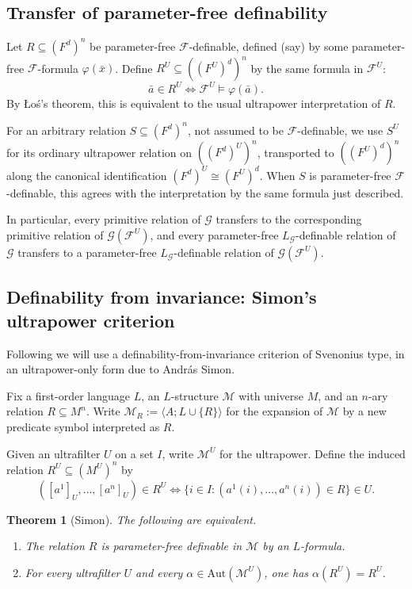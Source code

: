 \documentclass[11pt,a4paper]{article}
\newcommand{\G}{\mathcal{G}}
\newcommand{\F}{\mathcal{F}}
\newcommand{\M}{\mathcal{M}}
\newtheorem{theorem}{Theorem}[section]
\theoremstyle{definition}
\begin{document}

\subsection{Transfer of parameter-free definability}
\label{sec:3.2}

Let $R\subseteq (F^d)^n$ be parameter-free $\F$-definable, defined (say)
by some parameter-free $\F$-formula $\varphi(\bar x)$. 
Define $R^U\subseteq ((F^U)^d)^n$ by the same formula in
$\F^U$: \[
\bar a\in R^U \iff \F^U\models \varphi(\bar a).
\] By Łoś's theorem, this is equivalent to the usual ultrapower
interpretation of $R$.

For an arbitrary relation $S\subseteq (F^d)^n$, not assumed to be
$\F$-definable, we use $S^U$ for its ordinary ultrapower relation on
$((F^d)^U)^n$, transported to $((F^U)^d)^n$ along the canonical
identification $(F^d)^U\cong(F^U)^d$. When $S$ is parameter-free
$\F$-definable, this agrees with the interpretation by the same formula
just described.

In particular, every primitive relation of $\G$ transfers to the
corresponding primitive relation of $\G(\F^U)$, and every
parameter-free $L_{\G}$-definable relation of $\G$ transfers to a
parameter-free $L_{\G}$-definable relation of $\G(\F^U)$.

\subsection{Definability from invariance: Simon's ultrapower criterion}
\label{sec:3.3}

Following \cite{MSS26} we will use a definability-from-invariance criterion of Svenonius type,
in an ultrapower-only form due to Andr\'as Simon.

Fix a first-order language $L$, an $L$-structure $\M$ with universe $M$, and an
$n$-ary relation $R\subseteq M^n$. Write
$\M_R:=\langle A;L\cup\{R\}\rangle$ for the expansion of $\M$ by a new
predicate symbol interpreted as $R$.

Given an ultrafilter $U$ on a set $I$, write $\M^U$ for the
ultrapower. Define the induced relation $R^U\subseteq (M^U)^n$ by \[
([a^1]_U,\dots,[a^n]_U)\in R^U \iff \{i\in I : (a^1(i),\dots,a^n(i))\in R\}\in U.
\]

\begin{theorem}[Simon]
\label{thm:3.2}
The following are equivalent.

\begin{enumerate}
\item
  The relation $R$ is parameter-free definable in $\M$ by an
  $L$-formula.
\item
  For every ultrafilter $U$ and every $\alpha\in \mathrm{Aut}(\M^U)$,
  one has $\alpha(R^U)=R^U$.
\end{enumerate}
\end{theorem}
\end{document}
